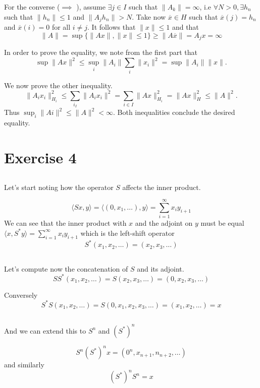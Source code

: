 \documentclass[a4paper,12pt]{article} %
\begin{document}
For the converse (\(\implies \) ), assume \(\exists j \in  I\) such that \(\| A_k \| = \infty  \), i.e \(\forall N >0, \exists  h_n  \) such that \(\| h_n \|\leq 1 \) and \(\| A_j h_n \| >N\).
Take now \(\overline{x} \in  H \) such that \(\overline{x}(j)=h_n\) and \(\overline{x}(i) = 0  \) for all \(i\neq j\). It follows that \(\| x \|\leq 1 \) and that
\begin{equation}
    \| A \|  = \sup \{ \| Ax \| , \| x \|\leq 1  \} \geq \| A \overline{x}  \| = A_j x = \infty
\end{equation}


In order to prove the equality, we note from the first part that
\begin{equation}
    \sup \| Ax \| ^2 \leq  \sup _i \| A_i \| \sum_{i}\| x_i \|^2 = \sup \| A_i \| \| x \|.
\end{equation}

We now prove the other inequality.
\begin{equation}
    \| A_i x_i \|_{H_i}^2 \leq  \sum_{i_I} \| A_i x_i \|^{2} = \sum_{i \in I}\| A x\|^2_{H_i} = \| Ax \|^2 _H \leq  \| A \| ^2.
\end{equation}
Thus \(\sup _i \| Ai \|^2 \leq  \| A \| ^2 <\infty  \). Both inequalities conclude the desired equality.

\section{Exercise 4}
\subsection{}

Let's start noting how the operator \(S\) affects the inner product.

\[
    \langle Sx,y \rangle = \langle (0,x_1  , \dots ),y \rangle = \sum_{i=1}^{\infty} x_i y_{i+1}
\]
We can see that the inner product with \(x\) and the adjoint on \(y\) must be equal  \(\langle x,S^*y \rangle=\sum_{i=1}^{\infty} x_i y_{i+1} \)
which is the left-shift operator
\[
    S^*(x_1,x_2,\dots ) = (x_2,x_3, \dots  )
\]
\subsection{}
Let's compute now the concatenation of \(S\) and its adjoint.
\[
    SS^*(x_1,x_2,\dots )=S(x_2,x_3, \dots  ) = (0,x_2,x_3, \dots  )
\]

Conversely
\[
    S^*S(x_1,x_2,\dots )=S(0,x_1,x_2,x_3, \dots  ) = (x_1,x_2, \dots  ) = x
\]

\subsection{}
And we can extend this to \(S^n\) and \((S^*)^n\)

\[
    S^n (S^*)^nx = (0^n,x_{n+1}, n_{n+2},\dots )
\]
and similarly
\[
    (S^*)^n S^n = x
\]
\end{document}
